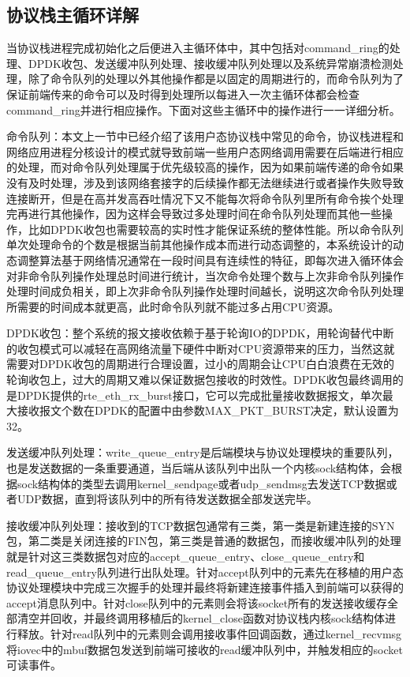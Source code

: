 \subsection{协议栈主循环详解} %
当协议栈进程完成初始化之后便进入主循环体中，其中包括对command\_ring的处理、DPDK收包、发送缓冲队列处理、接收缓冲队列处理以及系统异常崩溃检测处理，除了命令队列的处理以外其他操作都是以固定的周期进行的，而命令队列为了保证前端传来的命令可以及时得到处理所以每进入一次主循环体都会检查command\_ring并进行相应操作。下面对这些主循环中的操作进行一一详细分析。

命令队列：本文上一节中已经介绍了该用户态协议栈中常见的命令，协议栈进程和网络应用进程分核设计的模式就导致前端一些用户态网络调用需要在后端进行相应的处理，而对命令队列处理属于优先级较高的操作，因为如果前端传递的命令如果没有及时处理，涉及到该网络套接字的后续操作都无法继续进行或者操作失败导致连接断开，但是在高并发高吞吐情况下又不能每次将命令队列里所有命令挨个处理完再进行其他操作，因为这样会导致过多处理时间在命令队列处理而其他一些操作，比如DPDK收包也需要较高的实时性才能保证系统的整体性能。所以命令队列单次处理命令的个数是根据当前其他操作成本而进行动态调整的，本系统设计的动态调整算法基于网络情况通常在一段时间具有连续性的特征，即每次进入循环体会对非命令队列操作处理总时间进行统计，当次命令处理个数与上次非命令队列操作处理时间成负相关，即上次非命令队列操作处理时间越长，说明这次命令队列处理所需要的时间成本就更高，此时命令队列就不能过多占用CPU资源。

DPDK收包：整个系统的报文接收依赖于基于轮询IO的DPDK，用轮询替代中断的收包模式可以减轻在高网络流量下硬件中断对CPU资源带来的压力，当然这就需要对DPDK收包的周期进行合理设置，过小的周期会让CPU白白浪费在无效的轮询收包上，过大的周期又难以保证数据包接收的时效性。DPDK收包最终调用的是DPDK提供的rte\_eth\_rx\_burst接口，它可以完成批量接收数据报文，单次最大接收报文个数在DPDK的配置中由参数MAX\_PKT\_BURST决定，默认设置为32。

发送缓冲队列处理：write\_queue\_entry是后端模块与协议处理模块的重要队列，也是发送数据的一条重要通道，当后端从该队列中出队一个内核sock结构体，会根据sock结构体的类型去调用kernel\_sendpage或者udp\_sendmsg去发送TCP数据或者UDP数据，直到将该队列中的所有待发送数据全部发送完毕。

接收缓冲队列处理：接收到的TCP数据包通常有三类，第一类是新建连接的SYN包，第二类是关闭连接的FIN包，第三类是普通的数据包，而接收缓冲队列的处理就是针对这三类数据包对应的accept\_queue\_entry、close\_queue\_entry和read\_queue\_entry队列进行出队处理。针对accept队列中的元素先在移植的用户态协议处理模块中完成三次握手的处理并最终将新建连接事件插入到前端可以获得的accept消息队列中。针对close队列中的元素则会将该socket所有的发送接收缓存全部清空并回收，并最终调用移植后的kernel\_close函数对协议栈内核sock结构体进行释放。针对read队列中的元素则会调用接收事件回调函数，通过kernel\_recvmsg将iovec中的mbuf数据包发送到前端可接收的read缓冲队列中，并触发相应的socket可读事件。


